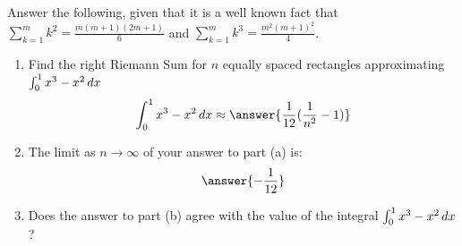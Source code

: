 \documentclass{ximera}
\author{Gregory Hartman \and Matthew Carr}
\begin{document}
\begin{exercise}




Answer the following, given that it is a well known fact that  $\sum_{k=1}^{m}k^2=\frac{m(m+1)(2m+1)}{6}$ and $\sum_{k=1}^{m}k^3=\frac{m^2(m+1)^2}{4}$.
\begin{enumerate}
\item		Find the right Riemann Sum for $n$ equally spaced rectangles approximating $\int_{0}^{1}x^3-x^2\,d x$ \[\int_{0}^{1}x^3-x^2\d x\approx\answer{\frac{1}{12}(\frac{1}{n^2}-1)}\]
\item		The limit as $n\to\infty$ of your answer to part (a) is: \[\answer{-\frac{1}{12}}\]
\item		Does the answer to part (b) agree with the value of the integral $\int_{0}^{1}x^3-x^2\,d x$? 
\begin{multipleChoice}
\end{multipleChoice}
\end{enumerate}
\end{exercise}
\end{document}

